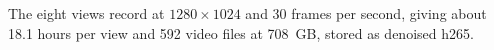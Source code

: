 
The eight views record at $1280 \times 1024$ and 30 frames per second, giving
about 18.1 hours per view and 592 video files at 708~GB, stored as denoised
h265.

%
%
%

